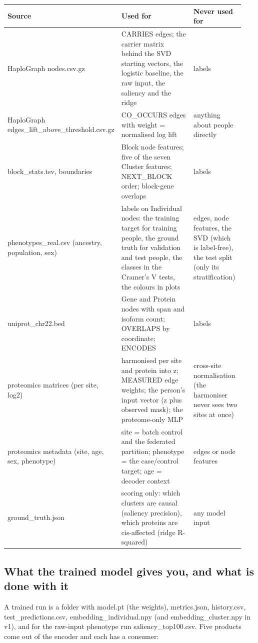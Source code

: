 \documentclass[11pt,a4paper]{article}
\begin{document}
\begin{longtable}{p{0.226\linewidth}p{0.470\linewidth}p{0.244\linewidth}}
\toprule
\textbf{Source} & \textbf{Used for} & \textbf{Never used for} \\
\midrule
\endhead
HaploGraph nodes.csv.gz & CARRIES edges; the carrier matrix behind the SVD starting vectors, the logistic baseline, the raw input, the saliency and the ridge & labels \\
HaploGraph edges\_lift\_above\_threshold.csv.gz & CO\_OCCURS edges with weight = normalised log lift & anything about people directly \\
block\_stats.tsv, boundaries & Block node features; five of the seven Cluster features; NEXT\_BLOCK order; block-gene overlaps & labels \\
phenotypes\_real.csv (ancestry, population, sex) & labels on Individual nodes: the training target for training people, the ground truth for validation and test people, the classes in the Cramer's V tests, the colours in plots & edges, node features, the SVD (which is label-free), the test split (only its stratification) \\
uniprot\_chr22.bed & Gene and Protein nodes with span and isoform count; OVERLAPS by coordinate; ENCODES & labels \\
proteomics matrices (per site, log2) & harmonised per site and protein into z; MEASURED edge weights; the person's input vector (z plus observed mask); the proteome-only MLP & cross-site normalisation (the harmoniser never sees two sites at once) \\
proteomics metadata (site, age, sex, phenotype) & site = batch control and the federated partition; phenotype = the case/control target; age = decoder context & edges or node features \\
ground\_truth.json & scoring only: which clusters are causal (saliency precision), which proteins are cis-affected (ridge R-squared) & any model input \\
\bottomrule
\end{longtable}

\subsection{What the trained model gives you, and what is done with it}

A trained run is a folder with model.pt (the weights), metrics.json, history.csv, test\_predictions.csv, embedding\_individual.npy (and embedding\_cluster.npy in v1), and for the raw-input phenotype run saliency\_top100.csv. Five products come out of the encoder and each has a consumer:
\end{document}
